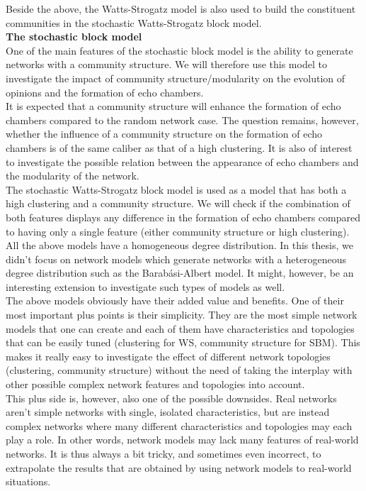\documentclass[11 pt , letterpaper , twoside , openright]{book}
\begin{document}
Beside the above, the Watts-Strogatz model is also used to build the constituent communities in the stochastic Watts-Strogatz block model.\\
\newline
\textbf{The stochastic block model}\\
\newline
One of the main features of the stochastic block model is the ability to generate networks with a community structure. We will therefore use this model to investigate the impact of community structure/modularity on the evolution of opinions and the formation of echo chambers.\\
It is expected that a community structure will enhance the formation of echo chambers compared to the random network case. The question remains, however, whether the influence of a community structure on the formation of echo chambers is of the same caliber as that of a high clustering. It is also of interest to investigate the possible relation between the appearance of echo chambers and the modularity of the network.\\
The stochastic Watts-Strogatz block model is used as a model that has both a high clustering and a community structure. We will check if the combination of both features displays any difference in the formation of echo chambers compared to having only a single feature (either community structure or high clustering).\\
\newline
All the above models have a homogeneous degree distribution. In this thesis, we didn't focus on network models which generate networks with a heterogeneous degree distribution such as the Barab\'{a}si-Albert model. It might, however, be an interesting extension to investigate such types of models as well.\\
\newline
The above models obviously have their added value and benefits. One of their most important plus points is their simplicity. They are the most simple network models that one can create and each of them have characteristics and topologies that can be easily tuned (clustering for WS, community structure for SBM). This makes it really easy to investigate the effect of different network topologies (clustering, community structure) without the need of taking the interplay with other possible complex network features and topologies into account.\\
This plus side is, however, also one of the possible downsides. Real networks aren't simple networks with single, isolated characteristics, but are instead complex networks where many different characteristics and topologies may each play a role. In other words, network models may lack many features of real-world networks. It is thus always a bit tricky, and sometimes even incorrect, to extrapolate the results that are obtained by using network models to real-world situations.\\
\end{document}
